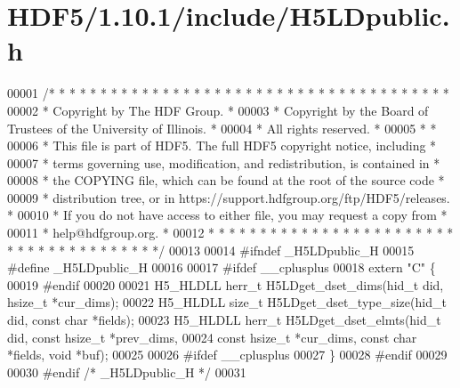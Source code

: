 \hypertarget{_h_d_f5_21_810_81_2include_2_h5_l_dpublic_8h_source}{}\section{H\+D\+F5/1.10.1/include/\+H5\+L\+Dpublic.h}
\label{_h_d_f5_21_810_81_2include_2_h5_l_dpublic_8h_source}

\begin{DoxyCode}
00001 \textcolor{comment}{/* * * * * * * * * * * * * * * * * * * * * * * * * * * * * * * * * * * * * * *}
00002 \textcolor{comment}{ * Copyright by The HDF Group.                                               *}
00003 \textcolor{comment}{ * Copyright by the Board of Trustees of the University of Illinois.         *}
00004 \textcolor{comment}{ * All rights reserved.                                                      *}
00005 \textcolor{comment}{ *                                                                           *}
00006 \textcolor{comment}{ * This file is part of HDF5.  The full HDF5 copyright notice, including     *}
00007 \textcolor{comment}{ * terms governing use, modification, and redistribution, is contained in    *}
00008 \textcolor{comment}{ * the COPYING file, which can be found at the root of the source code       *}
00009 \textcolor{comment}{ * distribution tree, or in https://support.hdfgroup.org/ftp/HDF5/releases.  *}
00010 \textcolor{comment}{ * If you do not have access to either file, you may request a copy from     *}
00011 \textcolor{comment}{ * help@hdfgroup.org.                                                        *}
00012 \textcolor{comment}{ * * * * * * * * * * * * * * * * * * * * * * * * * * * * * * * * * * * * * * */}
00013 
00014 \textcolor{preprocessor}{#ifndef \_H5LDpublic\_H}
00015 \textcolor{preprocessor}{#define \_H5LDpublic\_H}
00016 
00017 \textcolor{preprocessor}{#ifdef \_\_cplusplus}
00018 \textcolor{keyword}{extern} \textcolor{stringliteral}{"C"} \{
00019 \textcolor{preprocessor}{#endif}
00020 
00021 H5\_HLDLL herr\_t H5LDget\_dset\_dims(hid\_t did, hsize\_t *cur\_dims);
00022 H5\_HLDLL \textcolor{keywordtype}{size\_t} H5LDget\_dset\_type\_size(hid\_t did, \textcolor{keyword}{const} \textcolor{keywordtype}{char} *fields);
00023 H5\_HLDLL herr\_t H5LDget\_dset\_elmts(hid\_t did, \textcolor{keyword}{const} hsize\_t *prev\_dims,
00024     \textcolor{keyword}{const} hsize\_t *cur\_dims, \textcolor{keyword}{const} \textcolor{keywordtype}{char} *fields, \textcolor{keywordtype}{void} *buf);
00025 
00026 \textcolor{preprocessor}{#ifdef \_\_cplusplus}
00027 \}
00028 \textcolor{preprocessor}{#endif}
00029 
00030 \textcolor{preprocessor}{#endif }\textcolor{comment}{/* \_H5LDpublic\_H */}\textcolor{preprocessor}{}
00031 
\end{DoxyCode}

